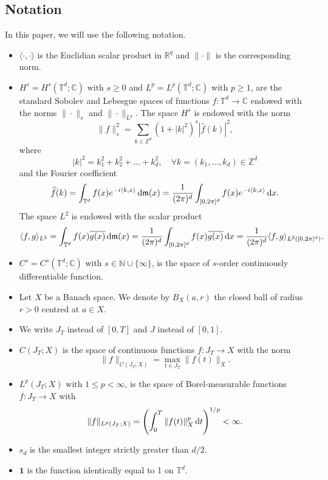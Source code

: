 \documentclass[review]{elsarticle}
\theoremstyle{dotless}
\def\d{{\,\rm d}}
\def \leq{\leqslant}
\def \geq{\geqslant}
\numberwithin{equation}{section}
\begin{document}
\subsection{Notation}
In this paper, we will use the following notation.
\begin{itemize}
	\item $\langle\cdot, \cdot\rangle$ is the Euclidian scalar product in $\mathbb{R}^q$ and $\|\cdot\|$ is the corresponding norm.
	\item $H^s=H^s\left(\mathbb{T}^d ; \mathbb{C}\right)\text{ with }s \geq 0$ and $L^p=L^p\left(\mathbb{T}^d ; \mathbb{C}\right)\text{ with }p \geq 1$, are the standard Sobolev and Lebesgue spaces of functions $f: \mathbb{T}^d \rightarrow \mathbb{C}$ endowed with the norms $\|\cdot\|_s$ and $\|\cdot\|_{L^p}$. 
	The space $ H^s $ is endowed with the norm
	\begin{equation*}
		\|f\|_{s}^2=\sum_{k \in \mathbb{Z}^d}\left(1+|k|^2\right)^s|\widehat{f}(k)|^2,
	\end{equation*}where
	\begin{equation*}
		|k|^2=k_1^2+k_2^2+\ldots+k_d^2,\quad \forall k=\left(k_1,\ldots,k_d\right)\in \mathbb{Z}^d
	\end{equation*}and the Fourier coefficient
	\begin{equation*}
		\widehat{f}(k)=\int_{\mathbb{T}^d} f(x) e^{-i \langle k , x\rangle} \d \mathfrak{m}(x)=\frac{1}{(2 \pi)^d} \int_{[0,2\pi]^d} f(x) e^{-i \langle k , x\rangle} \d x.
	\end{equation*}
	The space $L^2$ is endowed with the scalar product
	$$
	\langle f, g\rangle_{L^2}=\int_{\mathbb{T}^d} f(x) \overline{g(x)} \d \mathfrak{m}(x) =\frac{1}{(2 \pi)^d}\int_{[0,2\pi]^d} f(x) \overline{g(x)} \d x=\frac{1}{(2 \pi)^d} \langle f, g\rangle_{L^2([0,2\pi]^d)} .
	$$
	\item $C^s=C^s\left(\mathbb{T}^d ; \mathbb{C}\right)$ with $s \in \mathbb{N} \cup\{\infty\}$, is the space of $s$-order continuously differentiable function.
	\item Let $X$ be a Banach space. We denote by $B_X(a, r)$ the closed ball of radius $r>0$ centred at $a \in X$.
	\item  We write $J_T$ instead of $[0, T]$ and $J$ instead of $[0,1]$.
	\item $C\left(J_T ; X\right)$ is the space of continuous functions $f: J_T \rightarrow X$ with the norm
	$$
	\|f\|_{C\left(J_T ; X\right)}=\max _{t \in J_T}\|f(t)\|_X .
	$$
	\item $L^p\left(J_T ; X\right)\text{ with }1 \leq p<\infty$, is the space of Borel-measurable functions $f: J_T \rightarrow X$ with
	$$
	\|f\|_{L^p\left(J_T ; X\right)}=\left(\int_0^T\|f(t)\|_X^p \d t\right)^{1 / p}<\infty.
	$$
	\item $s_d$ is the smallest integer strictly greater than $d / 2$.
	\item $\mathbf{1}$ is the function identically equal to 1 on $\mathbb{T}^d$.
\end{itemize}
\end{document}

